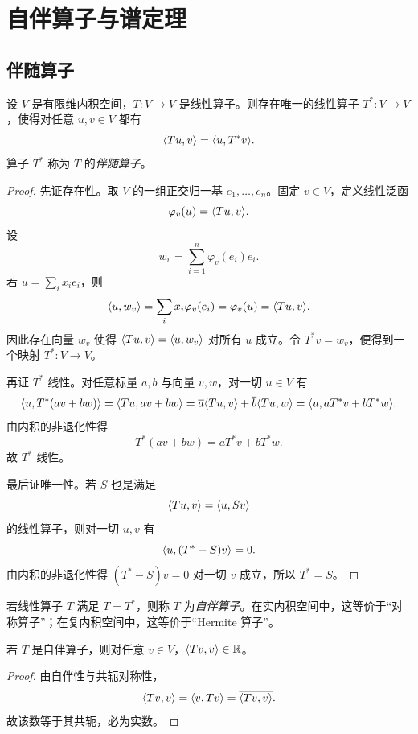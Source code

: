 \section{自伴算子与谱定理}

\subsection{伴随算子}

\begin{theorem}
设 $V$ 是有限维内积空间，$T:V\to V$ 是线性算子。则存在唯一的线性算子 $T^*:V\to V$，使得对任意 $u,v\in V$ 都有
\[
\langle Tu, v \rangle=\langle u, T^*v \rangle.
\]
算子 $T^*$ 称为 $T$ 的\emph{伴随算子}。
\end{theorem}

\begin{proof}
先证存在性。取 $V$ 的一组正交归一基 $e_1,\dots,e_n$。固定 $v\in V$，定义线性泛函
\[
\varphi_v(u)=\langle Tu, v \rangle.
\]
设
\[
w_v=\sum_{i=1}^n \overline{\varphi_v(e_i)}e_i.
\]
若 $u=\sum_i x_ie_i$，则
\[
\langle u, w_v \rangle=\sum_i x_i\varphi_v(e_i)=\varphi_v(u)=\langle Tu, v \rangle.
\]
因此存在向量 $w_v$ 使得 $\langle Tu, v \rangle=\langle u, w_v \rangle$ 对所有 $u$ 成立。令 $T^*v=w_v$，便得到一个映射 $T^*:V\to V$。

再证 $T^*$ 线性。对任意标量 $a,b$ 与向量 $v,w$，对一切 $u\in V$ 有
\[
\langle u, T^*(av+bw) \rangle=\langle Tu, av+bw \rangle=\overline{a}\langle Tu, v \rangle+\overline{b}\langle Tu, w \rangle
=\langle u, aT^*v+bT^*w \rangle.
\]
由内积的非退化性得
\[
T^*(av+bw)=aT^*v+bT^*w.
\]
故 $T^*$ 线性。

最后证唯一性。若 $S$ 也是满足
\[
\langle Tu, v \rangle=\langle u, Sv \rangle
\]
的线性算子，则对一切 $u,v$ 有
\[
\langle u, (T^*-S)v \rangle=0.
\]
由内积的非退化性得 $(T^*-S)v=0$ 对一切 $v$ 成立，所以 $T^*=S$。
\end{proof}

\begin{definition}
若线性算子 $T$ 满足 $T=T^*$，则称 $T$ 为\emph{自伴算子}。在实内积空间中，这等价于“对称算子”；在复内积空间中，这等价于“Hermite 算子”。
\end{definition}

\begin{proposition}
若 $T$ 是自伴算子，则对任意 $v\in V$，$\langle Tv, v \rangle\in\mathbb{R}$。
\end{proposition}

\begin{proof}
由自伴性与共轭对称性，
\[
\langle Tv, v \rangle=\langle v, Tv \rangle=\overline{\langle Tv, v \rangle}.
\]
故该数等于其共轭，必为实数。
\end{proof}

